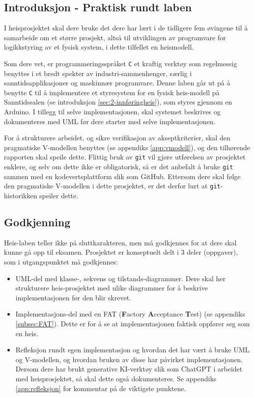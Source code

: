 
\begin{alphasection}

\section{Introduksjon - Praktisk rundt laben}
I heisprosjektet skal dere bruke det dere har lært i de tidligere fem øvingene til å samarbeide om et større prosjekt, altså til utviklingen av programvare for logikkstyring av et fysisk system, i dette tilfellet en heismodell.

Som dere vet, er programmeringsspråket \verb|C| et kraftig verktøy som regelmessig benyttes i et bredt spekter av industri-sammenhenger, særlig i sanntidsapplikasjoner og maskinnær programvare. Denne laben går ut på å benytte \verb|C| til å implementere et styresystem for en fysisk heis-modell på Sanntidssalen (se introduksjon \ref{sec:2-innføringheis}), som styres gjennom en Arduino. I tillegg til selve implementasjonen, skal systemet beskrives og dokumenteres med UML før dere starter med selve implementasjonen.

For å strukturere arbeidet, og sikre verifikasjon av akseptkriterier, skal den pragmatiske V-modellen benyttes (se appendiks \ref{app:vmodell}), og den tilhørende rapporten skal speile dette. Flittig bruk av \verb|git| vil gjøre utførelsen av prosjektet enklere, og selv om dette ikke er obligatorisk, så er det anbefalt å bruke \verb|git| sammen med en kodevertsplattform slik som GitHub. Ettersom dere skal følge den pragmatiske V-modellen i dette prosjektet, er det derfor lurt at \verb|git|-historikken speiler dette.

\subsection*{Godkjenning}

Heis-laben teller ikke på sluttkarakteren, men må godkjennes for at dere skal kunne gå opp til eksamen. Prosjektet er konseptuelt delt i 3 deler (oppgaver), som i utgangspunktet må godkjennes:
\begin{itemize}
    \item UML-del med klasse-, sekvens og tilstands-diagrammer. Dere skal her strukturere heis-prosjektet med ulike diagrammer for å beskrive implementasjonen før den blir skrevet.
    \item Implementasjons-del med en FAT (\textbf{F}actory \textbf{A}cceptance \textbf{T}est) (se appendiks \ref{subsec:FAT}). Dette er for å se at implementasjonen faktisk oppfører seg som en heis.
    \item Refleksjon rundt egen implementasjon og hvordan det har vært å bruke UML og V-modellen, og hvordan bruken av disse har påvirket implementasjonen. Dersom dere har brukt generative KI-verktøy slik som ChatGPT i arbeidet med heisprosjektet, så skal dette også dokumenteres. Se appendiks \ref{app:refleksjon} for kommentar på de viktigste punktene.
\end{itemize}


\end{alphasection}
